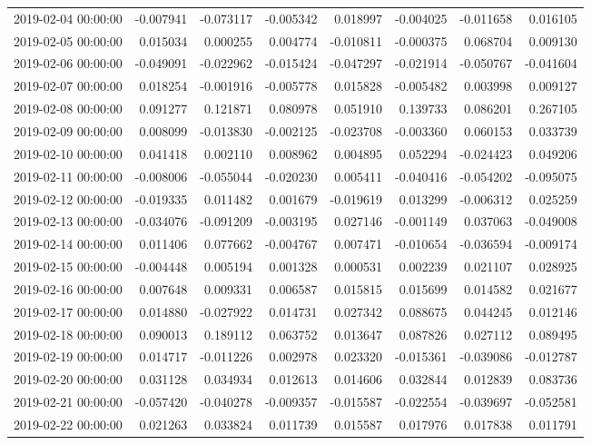 \begin{tabular}{lrrrrrrr}
2019-02-04 00:00:00 & -0.007941 & -0.073117 & -0.005342 & 0.018997 & -0.004025 & -0.011658 & 0.016105 \\
2019-02-05 00:00:00 & 0.015034 & 0.000255 & 0.004774 & -0.010811 & -0.000375 & 0.068704 & 0.009130 \\
2019-02-06 00:00:00 & -0.049091 & -0.022962 & -0.015424 & -0.047297 & -0.021914 & -0.050767 & -0.041604 \\
2019-02-07 00:00:00 & 0.018254 & -0.001916 & -0.005778 & 0.015828 & -0.005482 & 0.003998 & 0.009127 \\
2019-02-08 00:00:00 & 0.091277 & 0.121871 & 0.080978 & 0.051910 & 0.139733 & 0.086201 & 0.267105 \\
2019-02-09 00:00:00 & 0.008099 & -0.013830 & -0.002125 & -0.023708 & -0.003360 & 0.060153 & 0.033739 \\
2019-02-10 00:00:00 & 0.041418 & 0.002110 & 0.008962 & 0.004895 & 0.052294 & -0.024423 & 0.049206 \\
2019-02-11 00:00:00 & -0.008006 & -0.055044 & -0.020230 & 0.005411 & -0.040416 & -0.054202 & -0.095075 \\
2019-02-12 00:00:00 & -0.019335 & 0.011482 & 0.001679 & -0.019619 & 0.013299 & -0.006312 & 0.025259 \\
2019-02-13 00:00:00 & -0.034076 & -0.091209 & -0.003195 & 0.027146 & -0.001149 & 0.037063 & -0.049008 \\
2019-02-14 00:00:00 & 0.011406 & 0.077662 & -0.004767 & 0.007471 & -0.010654 & -0.036594 & -0.009174 \\
2019-02-15 00:00:00 & -0.004448 & 0.005194 & 0.001328 & 0.000531 & 0.002239 & 0.021107 & 0.028925 \\
2019-02-16 00:00:00 & 0.007648 & 0.009331 & 0.006587 & 0.015815 & 0.015699 & 0.014582 & 0.021677 \\
2019-02-17 00:00:00 & 0.014880 & -0.027922 & 0.014731 & 0.027342 & 0.088675 & 0.044245 & 0.012146 \\
2019-02-18 00:00:00 & 0.090013 & 0.189112 & 0.063752 & 0.013647 & 0.087826 & 0.027112 & 0.089495 \\
2019-02-19 00:00:00 & 0.014717 & -0.011226 & 0.002978 & 0.023320 & -0.015361 & -0.039086 & -0.012787 \\
2019-02-20 00:00:00 & 0.031128 & 0.034934 & 0.012613 & 0.014606 & 0.032844 & 0.012839 & 0.083736 \\
2019-02-21 00:00:00 & -0.057420 & -0.040278 & -0.009357 & -0.015587 & -0.022554 & -0.039697 & -0.052581 \\
2019-02-22 00:00:00 & 0.021263 & 0.033824 & 0.011739 & 0.015587 & 0.017976 & 0.017838 & 0.011791 \\

\end{tabular}
